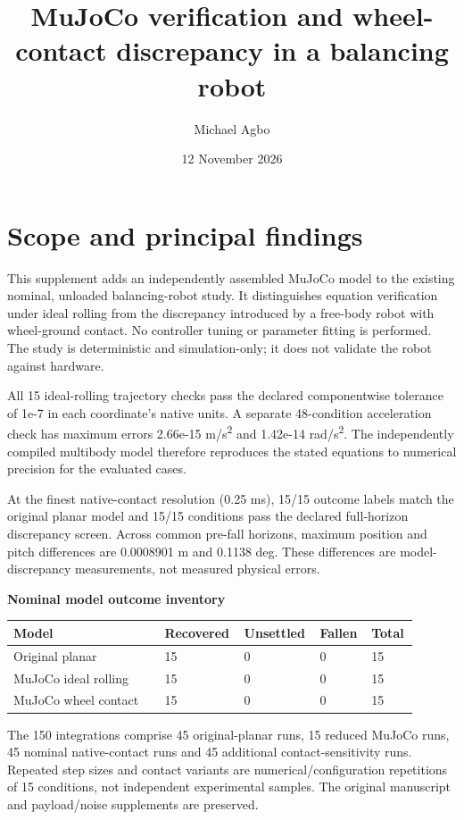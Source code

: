\documentclass[11pt,a4paper]{article}
\title{MuJoCo verification and wheel-contact discrepancy in a balancing robot}
\author{Michael Agbo}
\date{12 November 2026}
\begin{document}
\maketitle
\section*{Scope and principal findings}
This supplement adds an independently assembled MuJoCo model to the existing nominal, unloaded balancing-robot study. It distinguishes equation verification under ideal rolling from the discrepancy introduced by a free-body robot with wheel-ground contact. No controller tuning or parameter fitting is performed. The study is deterministic and simulation-only; it does not validate the robot against hardware.

All 15 ideal-rolling trajectory checks pass the declared componentwise tolerance of 1e-7 in each coordinate's native units. A separate 48-condition acceleration check has maximum errors 2.66e-15 m/s\textsuperscript{2} and 1.42e-14 rad/s\textsuperscript{2}. The independently compiled multibody model therefore reproduces the stated equations to numerical precision for the evaluated cases.

At the finest native-contact resolution (0.25 ms), 15/15 outcome labels match the original planar model and 15/15 conditions pass the declared full-horizon discrepancy screen. Across common pre-fall horizons, maximum position and pitch differences are 0.0008901 m and 0.1138 deg. These differences are model-discrepancy measurements, not measured physical errors.

\textbf{Nominal model outcome inventory}
\begin{longtable}{p{0.36\linewidth}p{0.153\linewidth}p{0.153\linewidth}p{0.117\linewidth}p{0.117\linewidth}}
\toprule
Model & Recovered & Unsettled & Fallen & Total \\ \midrule \endhead
Original planar & 15 & 0 & 0 & 15 \\
MuJoCo ideal rolling & 15 & 0 & 0 & 15 \\
MuJoCo wheel contact & 15 & 0 & 0 & 15 \\
\bottomrule
\end{longtable}
The 150 integrations comprise 45 original-planar runs, 15 reduced MuJoCo runs, 45 nominal native-contact runs and 45 additional contact-sensitivity runs. Repeated step sizes and contact variants are numerical/configuration repetitions of 15 conditions, not independent experimental samples. The original manuscript and payload/noise supplements are preserved.
\end{document}
